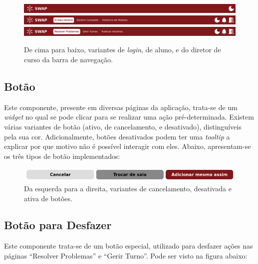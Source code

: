 \documentclass[12pt, a4paper]{article}
\begin{document}
\begin{figure}[H]
    \centering
    \includegraphics[width=\textwidth]{res/components/navbar-login.png}
    \includegraphics[width=\textwidth]{res/components/navbar-student.png}
    \includegraphics[width=\textwidth]{res/components/navbar-director.png}
    \caption{
        \onehalfspacing
        De cima para baixo, variantes de \emph{login}, de aluno, e do diretor de curso da barra de
        navegação.
    }
    \label{navbar}
\end{figure}

\subsection{Botão}

Este componente, presente em diversas páginas da aplicação, trata-se de um \emph{widget} no qual se
pode clicar para se realizar uma ação pré-determinada. Existem várias variantes de botão (ativo, de
cancelamento, e desativado), distinguíveis pela sua cor. Adicionalmente, botões desativados podem
ter uma \emph{tooltip} a explicar por que motivo não é possível interagir com eles. Abaixo,
apresentam-se os três tipos de botão implementados:

\begin{figure}[H]
    \centering
    \includegraphics[width=\textwidth]{res/components/button.png}
    \caption{Da esquerda para a direita, variantes de cancelamento, desativada e ativa de botões.}
    \label{button}
\end{figure}

\subsection{Botão para Desfazer}

Este componente trata-se de um botão especial, utilizado para desfazer ações nas páginas
``Resolver Problemas'' e ``Gerir Turno''. Pode ser visto na figura abaixo:
\end{document}
